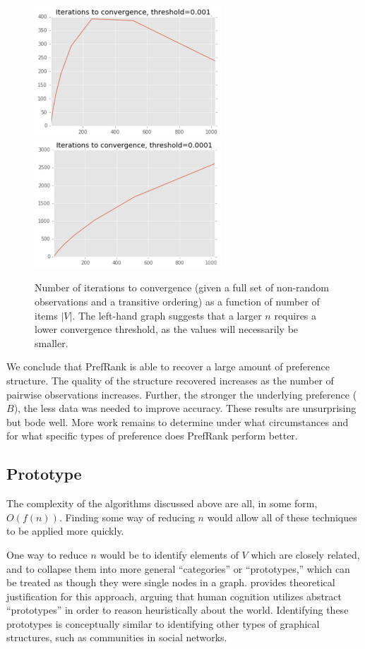 \begin{figure}[!htb]
\includegraphics[width=	7cm]{images/pr_iter_001}
\hfill
\includegraphics[width=7cm]{images/pr_iter_0001}
\caption{Number of iterations to convergence (given a full set of non-random observations and a transitive ordering) as a function of number of items $|V|$. The left-hand graph suggests that a larger $n$ requires a lower convergence threshold, as the values will necessarily be smaller.}
\label{fig:pr_1} 
\end{figure}

We conclude that PrefRank is able to recover a large amount of preference structure.
The quality of the structure recovered increases as the number of pairwise observations increases.
Further, the stronger the underlying preference ($B$), the less data was needed to improve accuracy.
These results are unsurprising but bode well.
More work remains to determine under what circumstances and for what specific types of preference does PrefRank perform better.

\subsection{Prototype}

The complexity of the algorithms discussed above are all, in some form, $O(f(n))$.
Finding some way of reducing $n$ would allow all of these techniques to be applied more quickly.

\bigskip

One way to reduce $n$ would be to identify elements of $V$ which are closely related, and to collapse them into more general ``categories'' or ``prototypes,'' which can be treated as though they were single nodes in a graph.
\citet{rosch:1973} provides theoretical justification for this approach, arguing that human cognition utilizes abstract ``prototypes'' in order to reason heuristically about the world.
Identifying these prototypes is conceptually similar to identifying other types of graphical structures, such as communities in social networks.

